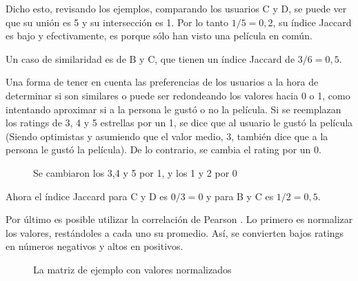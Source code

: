 Dicho esto, revisando los ejemplos, comparando los usuarios C y D, se puede ver que su unión es 5 y su intersección es 1. Por lo tanto $1 / 5 = 0,2$, su índice Jaccard es bajo y efectivamente, es porque sólo han visto una película en común. 

Un caso de similaridad es de B y C, que tienen un índice Jaccard de $3/6 = 0,5 $.

Una forma de tener en cuenta las preferencias de los usuarios a la hora de determinar si son similares o puede ser redondeando los valores hacia 0 o 1, como intentando aproximar si a la persona le gustó o no la película. Si se reemplazan los ratings de 3, 4 y 5 estrellas por un 1, se dice que al usuario le gustó la película (Siendo optimistas y asumiendo que el valor medio, 3, también dice que a la persona le gustó la película). De lo contrario, se cambia el rating por un 0.

\begin{figure}[h!]
\caption{Se cambiaron los 3,4 y 5 por 1, y los 1 y 2 por 0}
\end{figure}

Ahora el índice Jaccard para C y D es $0 / 3 = 0$ y para B y C es $ 1 / 2 = 0,5$.

Por último es posible utilizar la correlación de Pearson \cite{Girgin,Victor}. Lo primero es normalizar los valores, restándoles a cada uno su promedio. Así, se convierten bajos ratings en números negativos y altos en positivos. 

\begin{figure}[h!]
\caption{La matriz de ejemplo con valores normalizados}
\end{figure} 

